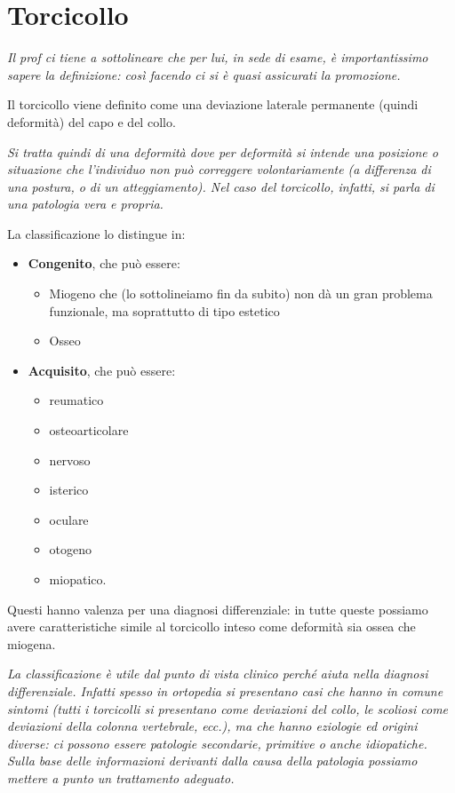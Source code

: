 \section{Torcicollo}

\emph{Il prof ci tiene a sottolineare che per lui, in sede di esame, è importantissimo sapere la definizione: così facendo ci si è quasi assicurati la promozione.}

Il torcicollo viene definito come una deviazione laterale permanente (quindi deformità) del capo e del collo.

\emph{Si tratta quindi di una deformità dove per deformità si intende una posizione o situazione che l'individuo non può correggere volontariamente (a differenza di una postura, o di un atteggiamento).
Nel caso del torcicollo, infatti, si parla di una patologia vera e propria.}

La classificazione lo distingue in:

\begin{itemize}
\item
  \textbf{Congenito}, che può essere:
\begin{itemize}
\item
  Miogeno che (lo sottolineiamo fin da subito) non dà un gran problema funzionale, ma soprattutto di tipo estetico
\item
  Osseo
\end{itemize}
\item
  \textbf{Acquisito}, che può essere:
\begin{itemize}
\item reumatico
\item osteoarticolare
\item nervoso
\item isterico
\item oculare
\item otogeno
\item miopatico.
\end{itemize}
\end{itemize}

Questi hanno valenza per una diagnosi differenziale: in tutte queste possiamo avere caratteristiche simile al torcicollo inteso come deformità sia ossea che miogena.

\emph{La classificazione è utile dal punto di vista clinico perché aiuta nella diagnosi differenziale. Infatti spesso in ortopedia si presentano casi che hanno in comune sintomi (tutti i torcicolli si presentano come deviazioni del collo, le scoliosi come deviazioni della colonna vertebrale, ecc.), ma che hanno eziologie ed origini diverse: ci possono essere patologie secondarie, primitive o anche idiopatiche. Sulla base delle informazioni derivanti dalla causa della patologia possiamo mettere a punto un trattamento adeguato.}

